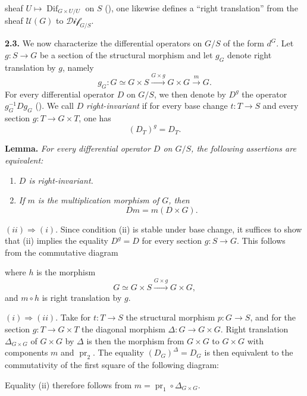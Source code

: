 sheaf \(U\mapsto\operatorname{Dif}_{G\times U/U}\) on \(S\)
(), one likewise defines a ``right translation'' from the sheaf
\(\mathcal U(G)\) to \(\mathcal{Dif}_{G/S}\).

\medskip
\noindent\textbf{2.3.}
\label{sga3:VIIA:2.3}
We now characterize the differential operators on \(G/S\) of the
form \(d^G\). Let \(g:S\to G\) be a section of the structural
morphism and let \(g_G\) denote right translation by \(g\), namely
\[
  g_G:
  G\simeq G\times S
  \xrightarrow{G\times g}G\times G
  \xrightarrow{m}G.
\]
For every differential operator \(D\) on \(G/S\), we then denote by
\(D^g\) the operator \(g_G^{-1}Dg_G\) ().
We call \(D\) \emph{right-invariant} if for every base change
\(t:T\to S\) and every section \(g:T\to G\times T\), one has
\[
  (D_T)^g=D_T.
\]

\medskip
\noindent\textbf{Lemma.}
\label{sga3:VIIA:2.3-invariance-lemma}
\textit{For every differential operator \(D\) on \(G/S\), the
following assertions are equivalent:}
\begin{enumerate}
\item[\textit{(i)}] \textit{\(D\) is right-invariant.}
\item[\textit{(ii)}] \textit{If \(m\) is the multiplication morphism of
\(G\), then}
\[
  Dm=m(D\times G).
\]
\end{enumerate}

\noindent\((ii)\Rightarrow(i)\).
Since condition (ii) is stable under base change, it suffices to show
that (ii) implies the equality \(D^g=D\) for every section
\(g:S\to G\). This follows from the commutative diagram
\begin{center}
  \label{sga3:VIIA:2.3-ii-implies-i}
  
\end{center}
where \(h\) is the morphism
\[
  G\simeq G\times S\xrightarrow{G\times g}G\times G,
\]
and \(m\circ h\) is right translation by \(g\).

\noindent\((i)\Rightarrow(ii)\).
Take for \(t:T\to S\) the structural morphism \(p:G\to S\), and for
the section \(g:T\to G\times T\) the diagonal morphism
\(\Delta:G\to G\times G\). Right translation \(\Delta_{G\times G}\) of
\(G\times G\) by \(\Delta\) is then the morphism from \(G\times G\) to
\(G\times G\) with components \(m\) and \(\operatorname{pr}_2\). The
equality \((D_G)^\Delta=D_G\) is then equivalent to the commutativity
of the first square of the following diagram:
\begin{center}
  \label{sga3:VIIA:2.3-i-implies-ii}
  
\end{center}
Equality (ii) therefore follows from
\(m=\operatorname{pr}_1\circ\Delta_{G\times G}\).

